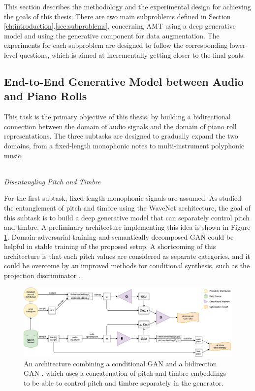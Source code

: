 This section describes the methodology and the experimental design for achieving the goals of this thesis.
There are two main subproblems defined in Section \ref{ch:introduction}.\ref{sec:subproblems}, concerning AMT using a deep generative model and using the generative component for data augmentation.
The experiments for each subproblem are designed to follow the corresponding lower-level questions, which is aimed at incrementally getting closer to the final goals.

\subsection{End-to-End Generative Model between Audio and Piano Rolls}

This task is the primary objective of this thesis, by building a bidirectional connection between the domain of audio signals and the domain of piano roll representations.
The three subtasks are designed to gradually expand the two domains, from a fixed-length monophonic notes to multi-instrument polyphonic music.

\mbox{}\\\noindent\emph{Disentangling Pitch and Timbre}\mbox{}

For the first subtask, fixed-length monophonic signals are assumed.
As  studied the entanglement of pitch and timbre using the WaveNet architecture, the goal of this subtask is to build a deep generative model that can separately control pitch and timbre.
A preliminary architecture implementing this idea is shown in Figure \ref{fig:pegan}.
Domain-adversarial training \cite{ganin2015domain} and semantically decomposed GAN \cite{donahue2017gan} could be helpful in stable training of the proposed setup.
A shortcoming of this architecture is that each pitch values are considered as separate categories, and it could be overcome by an improved methods for conditional synthesis, such as the projection discriminator \cite{miyato2018cgan}.

\begin{figure}
	\includegraphics[width=\textwidth]{PEGAN.pdf}
	\caption{An architecture combining a conditional GAN \protect\cite{mirza2014conditional} and a bidirection GAN \protect\cite{donahue2016bigan}, which uses a concatenation of pitch and timbre embeddings to be able to control pitch and timbre separately in the generator.}
	\label{fig:pegan}
\end{figure}

